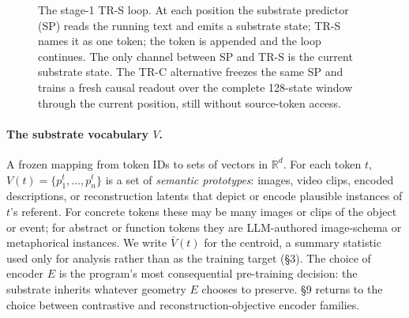 \documentclass[11pt,a4paper]{article}
\begin{document}
\begin{figure}[ht]
\centering
{}
\caption{The stage-1 TR-S loop. At each position the substrate predictor (SP) reads the running text and emits a substrate state; TR-S names it as one token; the token is appended and the loop continues. The only channel between SP and TR-S is the current substrate state. The TR-C alternative freezes the same SP and trains a fresh causal readout over the complete 128-state window through the current position, still without source-token access.}
\label{fig:arch}
\end{figure}

\paragraph{The substrate vocabulary $V$.} A frozen mapping from token IDs to sets of vectors in $\mathbb{R}^d$. For each token $t$, $V(t) = \{p_1^t, \dots, p_n^t\}$ is a set of \emph{semantic prototypes}: images, video clips, encoded descriptions, or reconstruction latents that depict or encode plausible instances of $t$'s referent. For concrete tokens these may be many images or clips of the object or event; for abstract or function tokens they are LLM-authored image-schema or metaphorical instances. We write $\bar{V}(t)$ for the centroid, a summary statistic used only for analysis rather than as the training target (§3). The choice of encoder $E$ is the program's most consequential pre-training decision: the substrate inherits whatever geometry $E$ chooses to preserve. §9 returns to the choice between contrastive and reconstruction-objective encoder families.
\end{document}
